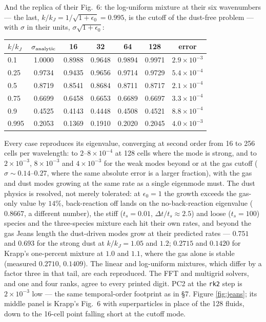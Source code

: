 \documentclass[11pt]{article}
\newcommand{\code}[1]{\texttt{#1}}
\begin{document}
And the replica of their Fig.\ 6: the log-uniform mixture at their six wavenumbers ---
the last, $k/k_J = 1/\sqrt{1+\epsilon_0} = 0.995$, is the cutoff of the dust-free
problem --- with $\sigma$ in their units, $\sigma\sqrt{1+\epsilon_0}$:

\begin{center}
\small
\begin{tabular}{@{}lcccccc@{}}
\toprule
$k/k_J$ & $\sigma_{\rm analytic}$ & 16 & 32 & 64 & 128 & error \\
\midrule
0.1 & 1.0000 & 0.8988 & 0.9648 & 0.9894 & 0.9971 & $2.9\times10^{-3}$ \\
0.25 & 0.9734 & 0.9435 & 0.9656 & 0.9714 & 0.9729 & $5.4\times10^{-4}$ \\
0.5 & 0.8719 & 0.8541 & 0.8684 & 0.8711 & 0.8717 & $2.1\times10^{-4}$ \\
0.75 & 0.6699 & 0.6458 & 0.6653 & 0.6689 & 0.6697 & $3.3\times10^{-4}$ \\
0.9 & 0.4525 & 0.4143 & 0.4448 & 0.4508 & 0.4521 & $8.8\times10^{-4}$ \\
0.995 & 0.2053 & 0.1369 & 0.1910 & 0.2020 & 0.2045 & $4.0\times10^{-3}$ \\
\bottomrule
\end{tabular}
\end{center}

Every case reproduces its eigenvalue, converging at second order from 16 to 256 cells
per wavelength: to $2$--$8\times10^{-4}$ at 128 cells where the mode is strong, and to
$2\times10^{-3}$, $8\times10^{-3}$ and $4\times10^{-3}$ for the weak modes beyond or at
the gas cutoff ($\sigma \sim 0.14$--$0.27$, where the same absolute error is a larger
fraction), with the gas and dust modes growing at the same rate as a single eigenmode
must. The dust physics is resolved, not merely tolerated: at $\epsilon_0 = 1$ the
growth exceeds the gas-only value by $14\%$, back-reaction off lands on the
no-back-reaction eigenvalue ($0.8667$, a different number), the stiff ($t_s = 0.01$,
$\Delta t/t_s \approx 2.5$) and loose ($t_s = 100$) species and the three-species
mixture each hit their own rates, and beyond the gas Jeans length the dust-driven modes
grow at their predicted rates --- $0.751$ and $0.693$ for the strong dust at
$k/k_J = 1.05$ and $1.2$; $0.2715$ and $0.1420$ for Krapp's one-percent mixture at
$1.0$ and $1.1$, where the gas alone is stable (measured $0.2710$, $0.1409$). The
linear and log-uniform mixtures, which differ by a factor three in that tail, are each
reproduced. The FFT and multigrid solvers, and one and four ranks, agree to every
printed digit. PC2 at the \code{rk2} step is $2\times10^{-3}$ low --- the same
temporal-order footprint as in \S7. Figure \ref{fig:jeans}; its middle panel is
Krapp's Fig.\ 6 with superparticles in place of the 128 fluids, down to the 16-cell
point falling short at the cutoff mode.
\end{document}
